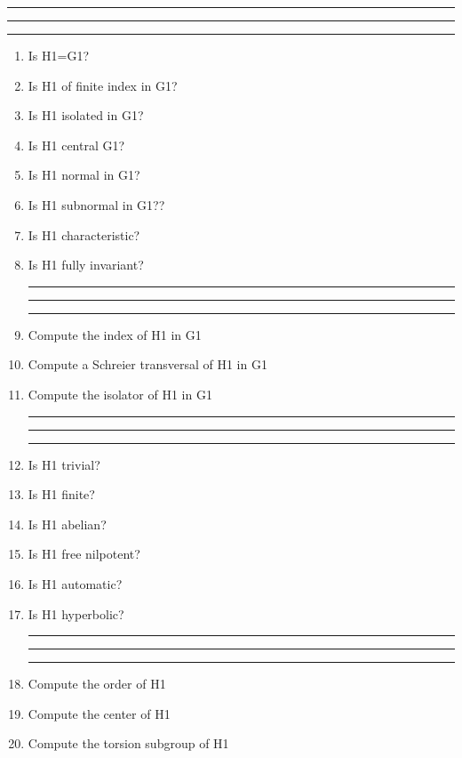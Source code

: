 
\bigskip
\hrule\hrule\hrule

\begin{enumerate}

\item Is H1=G1?

\item Is H1 of finite index in G1?

\item Is H1 isolated in G1?

\item Is H1 central G1?

\item Is H1 normal in G1?

\item Is H1 subnormal in G1??

\item Is H1 characteristic?

\item Is H1 fully invariant?


\bigskip
\hrule\hrule\hrule

\item Compute the index of H1 in G1

\item Compute a Schreier transversal of H1 in G1

\item Compute the isolator of H1 in G1

\bigskip
\hrule\hrule\hrule

\item Is H1 trivial?

\item Is H1 finite?

\item Is H1 abelian?

\item Is H1 free nilpotent?

\item Is H1 automatic?

\item Is H1 hyperbolic?

\bigskip
\hrule\hrule\hrule

\item Compute the order of H1

\item Compute the center of H1

\item Compute the torsion subgroup of H1


\end{enumerate}

